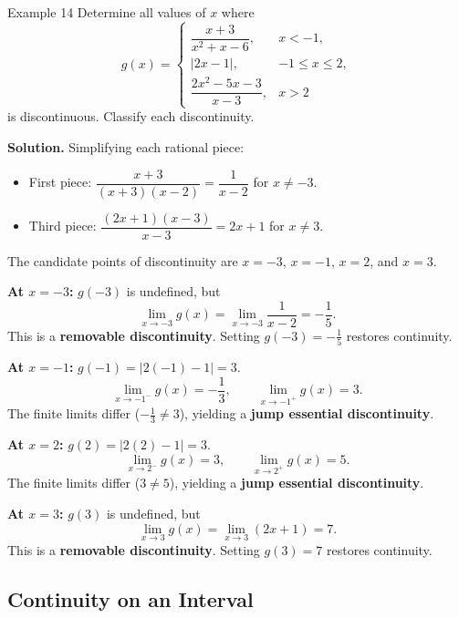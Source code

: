 \begin{examplebox}{Example 14}
Determine all values of \(x\) where
\[
g(x) = \begin{cases}
\dfrac{x + 3}{x^{2} + x - 6}, & x < -1, \\[10pt]
|2x - 1|, & -1 \le x \le 2, \\[10pt]
\dfrac{2x^{2} - 5x - 3}{x - 3}, & x > 2
\end{cases}
\]
is discontinuous. Classify each discontinuity.

\medskip
\textbf{Solution.}
Simplifying each rational piece:
\begin{itemize}
    \item First piece: \(\dfrac{x + 3}{(x + 3)(x - 2)} = \dfrac{1}{x - 2}\) for \(x \neq -3\).
    \item Third piece: \(\dfrac{(2x + 1)(x - 3)}{x - 3} = 2x + 1\) for \(x \neq 3\).
\end{itemize}
The candidate points of discontinuity are \(x = -3\), \(x = -1\), \(x = 2\), and \(x = 3\).

\medskip
\noindent\textbf{At \(x = -3\):} \(g(-3)\) is undefined, but
\[
\lim_{x \to -3} g(x) = \lim_{x \to -3} \frac{1}{x - 2} = -\frac{1}{5}.
\]
This is a \textbf{removable discontinuity}. Setting \(g(-3) = -\frac{1}{5}\) restores continuity.

\medskip
\noindent\textbf{At \(x = -1\):} \(g(-1) = |2(-1) - 1| = 3\).
\[
\lim_{x \to -1^{-}} g(x) = -\frac{1}{3}, \qquad \lim_{x \to -1^{+}} g(x) = 3.
\]
The finite limits differ (\(-\frac{1}{3} \neq 3\)), yielding a \textbf{jump essential discontinuity}.

\medskip
\noindent\textbf{At \(x = 2\):} \(g(2) = |2(2) - 1| = 3\).
\[
\lim_{x \to 2^{-}} g(x) = 3, \qquad \lim_{x \to 2^{+}} g(x) = 5.
\]
The finite limits differ (\(3 \neq 5\)), yielding a \textbf{jump essential discontinuity}.

\medskip
\noindent\textbf{At \(x = 3\):} \(g(3)\) is undefined, but
\[
\lim_{x \to 3} g(x) = \lim_{x \to 3} (2x + 1) = 7.
\]
This is a \textbf{removable discontinuity}. Setting \(g(3) = 7\) restores continuity.
\end{examplebox}


\subsection*{Continuity on an Interval}
\label{subsec:1.5.3}



